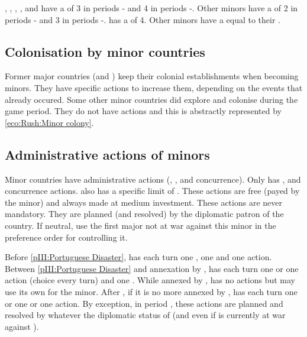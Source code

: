  \paysPortugal, \paysVenise, \paysGenes,
\paysSuede, \paysDanemark and \paysHollande have a \FTI of 3 in periods
- and 4 in periods -.
\bparag Other minors have a \FTI of 2 in periods - and 3
in periods -.
\bparag \paysHollande has a \DTI of 4.
Other minors have a \DTI equal to their \FTI.



\subsection{Colonisation by minor countries}

\aparag Former major countries (\paysPortugal and \paysVenise) keep their
colonial establishments when becoming minors. They have specific actions to
increase them, depending on the events that already occured.
\bparag Some other minor countries did explore and colonise during the game
period. They do not have actions and this is abstractly represented by
\ref{eco:Rush:Minor colony}.



\subsection{Administrative actions of minors}

\aparag Minor countries have administrative actions (\TFI, \COL, \TP and
concurrence).
\bparag Only \paysPortugal has \COL, \TP and concurrence actions. \paysVenise
also has a specific limit of \TFI.
\bparag These actions are free (payed by the minor) and always made at medium
investment.
\bparag These actions are never mandatory.
\bparag They are planned (and resolved) by the diplomatic patron of the
country. If neutral, use the first major not at war against this minor in the
preference order for controlling it.

\aparag[Portugal]
\bparag Before \ref{pIII:Portuguese Disaster}, \paysPortugal has each turn one
\COL, one \TP and one \TFI action.
\bparag Between \ref{pIII:Portuguese Disaster} and annexation by \HIS,
\paysPortugal has each turn one \COL or one \TP action (choice every turn) and
one \TFI.
\bparag While annexed by \HIS, \paysPortugal has no actions but \HIS may use
its own for the minor.
\bparag After , if it is no more annexed by \HIS,
\paysPortugal has each turn one \COL or one \TP or one \TFI action.
\bparag By exception, in period , these actions are planned and
resolved by \HIS whatever the diplomatic status of \paysPortugal (and even if
\HIS is currently at war against \paysPortugal).

